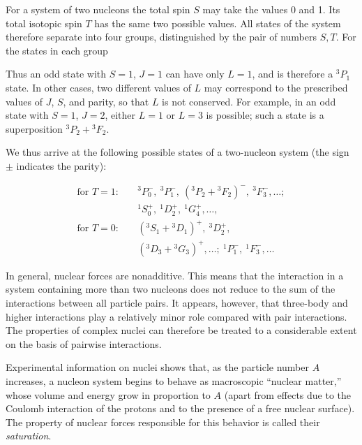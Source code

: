 For a system of two nucleons the total spin $S$ may take the values 0 and 1.
Its total isotopic spin $T$ has the same two possible values. All states of the
system therefore separate into four groups, distinguished by the pair of
numbers $S,T$. For the states in each group




Thus an odd state with $S=1$, $J=1$
can have only $L=1$, and is therefore a ${}^3P_1$ state. In other cases, two
different values of $L$ may correspond to the prescribed values of $J$, $S$,
and parity, so that $L$ is not conserved. For example, in an odd state with
$S=1$, $J=2$, either $L=1$ or $L=3$ is possible; such a state is a
superposition ${}^3P_2+{}^3F_2$.

We thus arrive at the following possible states of a two-nucleon system (the
sign $\pm$ indicates the parity):

\begin{align*}
 \text{for }T=1:&\quad {}^3P_0^-,\ {}^3P_1^-,\
 ({}^3P_2+{}^3F_2)^-,\ {}^3F_3^-,\ldots;\\
 &\quad {}^1S_0^+,\ {}^1D_2^+,\ {}^1G_4^+,\ldots,\\
 \text{for }T=0:&\quad ({}^3S_1+{}^3D_1)^+,\ {}^3D_2^+,\\
 &\quad ({}^3D_3+{}^3G_3)^+,\ldots;\
 {}^1P_1^-,\ {}^1F_3^-,\ldots
\end{align*}

In general, nuclear forces are nonadditive. This means that the interaction in
a system containing more than two nucleons does not reduce to the sum of the
interactions between all particle pairs. It appears, however, that three-body
and higher interactions play a relatively minor role compared with pair
interactions. The properties of complex nuclei can therefore be treated to a
considerable extent on the basis of pairwise interactions.

Experimental information on nuclei shows that, as the particle number $A$
increases, a nucleon system begins to behave as macroscopic ``nuclear matter,''
whose volume and energy grow in proportion to $A$ (apart from effects due to
the Coulomb interaction of the protons and to the presence of a free nuclear
surface). The property of nuclear forces responsible for this behavior is
called their \emph{saturation}.

